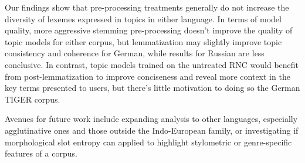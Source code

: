 \documentclass[11pt,a4paper]{article}
\begin{document}
Our findings show that pre-processing treatments generally do not increase the diversity of lexemes expressed in topics in either language. In terms of model quality, more aggressive stemming pre-processing doesn't improve the quality of topic models for either corpus, but lemmatization may slightly improve topic consistency and coherence for German, while results for Russian are less conclusive. In contrast, topic models trained on the untreated RNC would benefit from post-lemmatization to improve conciseness and reveal more context in the key terms presented to users, but there's little motivation to doing so the German TIGER corpus.

Avenues for future work include expanding analysis to other languages, especially agglutinative ones and those outside the Indo-European family, or investigating if morphological slot entropy can applied to highlight stylometric or genre-specific features of a corpus.






\end{document}
